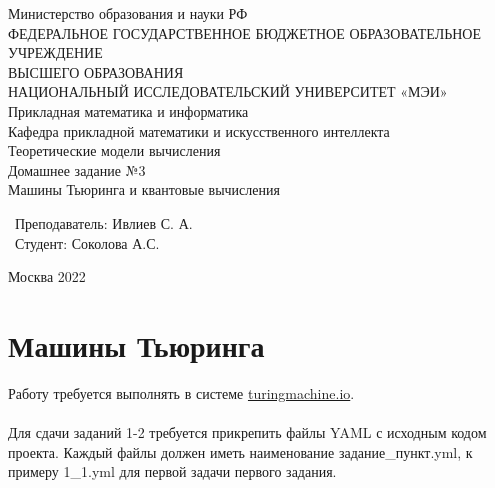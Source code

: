 \documentclass[a4paper]{article}
\begin{document}
\begin{center}
\hfill \break
\large{Министерство образования и науки РФ}\\
\large{ФЕДЕРАЛЬНОЕ ГОСУДАРСТВЕННОЕ БЮДЖЕТНОЕ ОБРАЗОВАТЕЛЬНОЕ УЧРЕЖДЕНИЕ}\\ 
\large{ВЫСШЕГО ОБРАЗОВАНИЯ}\\
\large{НАЦИОНАЛЬНЫЙ ИССЛЕДОВАТЕЛЬСКИЙ УНИВЕРСИТЕТ «МЭИ»}\\
\hfill \break
\normalsize{Прикладная математика и информатика}\\
 \hfill \break
\normalsize{Кафедра прикладной математики и искусственного интеллекта}\\
\hfill\break
\hfill \break
\hfill \break
\hfill \break
\large{Теоретические модели вычисления}\\
\hfill \break
\large{Домашнее задание №3}\\
\large{Машины Тьюринга и квантовые вычисления}\\
\hfill \break
\hfill \break
\hfill \break
\hfill \break
\hfill \break
\hfill \break
\end{center}
 
\normalsize{ 
\begin{flushright}
\ Преподаватель: Ивлиев С. А. \\
\ Студент: Соколова А.С. \
\end{flushright}
\hfill \break
\hfill \break
\hfill \break
\hfill \break
\hfill \break
\begin{center} Москва 2022 \end{center}
\thispagestyle{empty} %
} 

\newpage
    \tableofcontents %
\newpage
 

\newpage
\section{Машины Тьюринга}

Работу требуется выполнять в системе \url{turingmachine.io}. \\\\
Для сдачи заданий 1-2 требуется прикрепить файлы YAML с исходным кодом проекта. Каждый файлы должен иметь наименование задание\_пункт.yml, к примеру 1\_1.yml для первой задачи первого задания. \\\\
\end{document}
